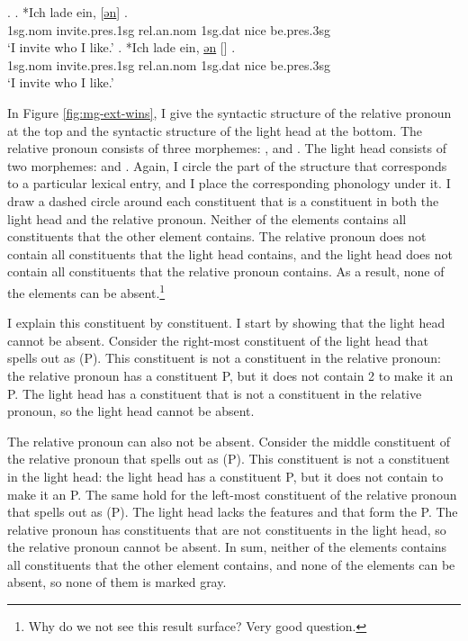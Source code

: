 \ex.\label{ex:mg-acc-nom-rep}
\ag. *Ich {lade ein}, [\underline{ən}] \underline{}   .\\
1\ac{sg}.\ac{nom} invite.\ac{pres}.1\ac{sg}\scsub{[acc]} \ac{rel}.\ac{an}.\ac{nom} 1\ac{sg}.\ac{dat} nice be.\ac{pres}.3\ac{sg}\scsub{[nom]}\\
`I invite who I like.' \label{ex:mg-acc-nom-rep-rel}
\bg. *Ich {lade ein}, \underline{ən} [\underline{}]   .\\
1\ac{sg}.\ac{nom} invite.\ac{pres}.1\ac{sg}\scsub{[acc]} \ac{rel}.\ac{an}.\ac{nom} 1\ac{sg}.\ac{dat} nice be.\ac{pres}.3\ac{sg}\scsub{[nom]}\\
`I invite who I like.' \label{ex:mg-acc-nom-rep-lh}

In Figure \ref{fig:mg-ext-wins}, I give the syntactic structure of the relative pronoun at the top and the syntactic structure of the light head at the bottom.
The relative pronoun consists of three morphemes: ,  and .
The light head consists of two morphemes:  and .
Again, I circle the part of the structure that corresponds to a particular lexical entry, and I place the corresponding phonology under it.
I draw a dashed circle around each constituent that is a constituent in both the light head and the relative pronoun.
Neither of the elements contains all constituents that the other element contains. The relative pronoun does not contain all constituents that the light head contains, and the light head does not contain all constituents that the relative pronoun contains. As a result, none of the elements can be absent.\footnote{
Why do we not see this result surface? Very good question.
}

I explain this constituent by constituent.
I start by showing that the light head cannot be absent.
Consider the right-most constituent of the light head that spells out as  (P). This constituent is not a constituent in the relative pronoun: the relative pronoun has a constituent P, but it does not contain 2 to make it an P.
The light head has a constituent that is not a constituent in the relative pronoun, so the light head cannot be absent.

The relative pronoun can also not be absent.
Consider the middle constituent of the relative pronoun that spells out as  (P). This constituent is not a constituent in the light head: the light head has a constituent P, but it does not contain  to make it an P.
The same hold for the left-most constituent of the relative pronoun that spells out as  (P). The light head lacks the features  and  that form the P.
The relative pronoun has constituents that are not constituents in the light head, so the relative pronoun cannot be absent.
In sum, neither of the elements contains all constituents that the other element contains, and none of the elements can be absent, so none of them is marked gray.

